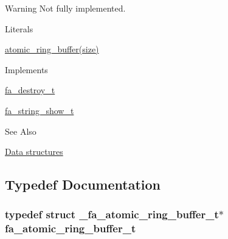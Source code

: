 \begin{DoxyWarning}{Warning}
Not fully implemented.
\end{DoxyWarning}
\begin{DoxyParagraph}{Literals}

\begin{DoxyItemize}
\item {\ttfamily \hyperlink{util_8h_a9d03b39b3482ef1468833e26c4dc318d}{atomic\-\_\-ring\-\_\-buffer(size)}}
\end{DoxyItemize}
\end{DoxyParagraph}
\begin{DoxyParagraph}{Implements }

\begin{DoxyItemize}
\item \hyperlink{structfa__destroy__t}{fa\-\_\-destroy\-\_\-t}
\item \hyperlink{structfa__string__show__t}{fa\-\_\-string\-\_\-show\-\_\-t}
\end{DoxyItemize}
\end{DoxyParagraph}
\begin{DoxySeeAlso}{See Also}

\begin{DoxyItemize}
\item \hyperlink{md__data_structures_DataStructures}{Data structures} 
\end{DoxyItemize}
\end{DoxySeeAlso}


\subsection{Typedef Documentation}
\hypertarget{group___fa_atomic_ring_buffer_ga3482421740e66f489d94407a0d48a2d0}{
\subsubsection[{fa\-\_\-atomic\-\_\-ring\-\_\-buffer\-\_\-t}]{\setlength{\rightskip}{0pt plus 5cm}typedef struct \-\_\-fa\-\_\-atomic\-\_\-ring\-\_\-buffer\-\_\-t$\ast$ {\bf fa\-\_\-atomic\-\_\-ring\-\_\-buffer\-\_\-t}}}\label{group___fa_atomic_ring_buffer_ga3482421740e66f489d94407a0d48a2d0}


